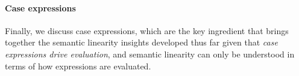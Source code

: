 \documentclass[acmsmall,review,anonymous]{acmart}
\newcommand{\incode}[1]{\lstinline{#1}}
\newcommand{\parawith}[1]{\paragraph{\emph{#1}}}
\newcommand{\lolli}{\multimap}
\begin{document}


\paragraph{Case expressions}
Finally, we discuss case expressions,
which are the key ingredient that brings together the
semantic linearity insights developed thus far given that
\emph{case expressions drive evaluation}, and semantic linearity can only be
understood in terms of how expressions are evaluated.
\end{document}
